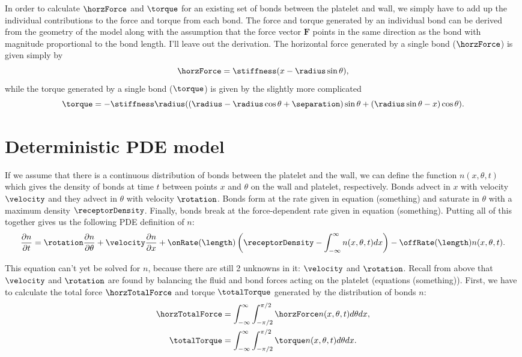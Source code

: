 In order to calculate $\horzForce$ and $\torque$ for an existing set
of bonds between the platelet and wall, we simply have to add up the
individual contributions to the force and torque from each bond. The
force and torque generated by an individual bond can be derived from
the geometry of the model along with the assumption that the force
vector $\mathbf{F}$ points in the same direction as the bond with
magnitude proportional to the bond length. I'll leave out the
derivation. The horizontal force generated by a single bond
($\horzForce$) is given simply by
\begin{equation}
  \label{eq:horz-force}
  \horzForce = \stiffness (x - \radius\sin\theta),
\end{equation}
while the torque generated by a single bond ($\torque$) is given by
the slightly more complicated
\begin{equation}
  \label{eq:torque}
  \torque = -\stiffness \radius ((\radius - \radius\cos\theta +
  \separation)\sin\theta + (\radius\sin\theta - x)\cos\theta).
\end{equation}

\section{Deterministic PDE model}
\label{sec:determ-pde-model}

If we assume that there is a continuous distribution of bonds between
the platelet and the wall, we can define the function $n(x, \theta,
t)$ which gives the density of bonds at time $t$ between points $x$
and $\theta$ on the wall and platelet, respectively. Bonds advect in
$x$ with velocity $\velocity$ and they advect in $\theta$ with
velocity $\rotation$. Bonds form at the rate given in equation
(something) and saturate in $\theta$ with a maximum density
$\receptorDensity$. Finally, bonds break at the force-dependent rate
given in equation (something). Putting all of this together gives us
the following PDE definition of $n$:
\begin{equation}
  \label{eq:bond-density}
  \frac{\partial n}{\partial t} = \rotation \frac{\partial n}{\partial
    \theta} + \velocity \frac{\partial n}{\partial x} +
  \onRate(\length) \left(\receptorDensity - \int_{-\infty}^{\infty}
    n(x, \theta, t) dx \right) - \offRate(\length) n(x, \theta, t).
\end{equation}

This equation can't yet be solved for $n$, because there are still 2
unknowns in it: $\velocity$ and $\rotation$. Recall from above that
$\velocity$ and $\rotation$ are found by balancing the fluid and bond
forces acting on the platelet (equations (something)). First, we have
to calculate the total force $\horzTotalForce$ and torque
$\totalTorque$ generated by the distribution of bonds $n$:
\begin{align}
  \label{eq:horz-total-force}
  \horzTotalForce &= \int_{-\infty}^{\infty} \int_{-\pi/2}^{\pi/2}
                    \horzForce n(x, \theta, t) d\theta dx, \\
  \label{eq:total-torque}
  \totalTorque &= \int_{-\infty}^{\infty} \int_{-\pi/2}^{\pi/2}
                 \torque n(x, \theta, t) d\theta dx.
\end{align}

